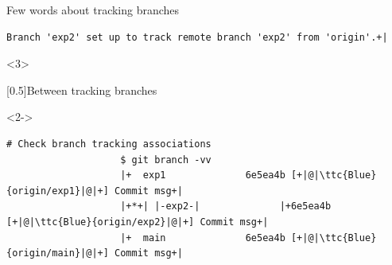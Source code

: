 \documentclass[usenames,svgnames,14pt]{beamer}
\newcommand{\ttc}[2]{\texttt{\textcolor{#1}{#2}}}%
\begin{document}
\begin{frame}[fragile]{Few words about tracking branches}
\begin{overlayarea}{\textwidth}{0.85\textheight}
\begin{onlyenv}
\begin{overlayarea}{\textwidth}{0.353\textheight}
\begin{onlyenv}
\begin{lstlisting}[style=MyBash, xrightmargin=-1mm, xleftmargin=-1mm, aboveskip=4mm]
                        Branch 'exp2' set up to track remote branch 'exp2' from 'origin'.+|
                    \end{lstlisting}
                \end{onlyenv}
                \begin{onlyenv}<3>
                    \begin{varblock}{}[0.5\textwidth]{Between tracking branches}
                    \end{varblock}
                \end{onlyenv}
            \end{overlayarea}
            \begin{onlyenv}<2->
                \begin{lstlisting}[style=MyBash, xrightmargin=-1mm, xleftmargin=-1mm, aboveskip=0.8mm]
                    # Check branch tracking associations
                    $ git branch -vv
                    |+  exp1              6e5ea4b [+|@|\ttc{Blue}{origin/exp1}|@|+] Commit msg+|
                    |+*+| |-exp2-|              |+6e5ea4b [+|@|\ttc{Blue}{origin/exp2}|@|+] Commit msg+|
                    |+  main              6e5ea4b [+|@|\ttc{Blue}{origin/main}|@|+] Commit msg+|
                \end{lstlisting}
            \end{onlyenv}
        \end{onlyenv}
    \end{overlayarea}
\end{frame}


\end{document}
